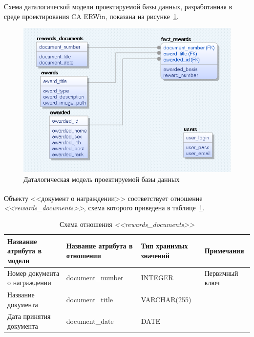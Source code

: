 Схема даталогической модели проектируемой базы данных, разработанная в среде проектирования CA ERWin, 
показана на рисунке~\ref{fig:er_physical}.

\begin{figure}[h]
  \centering
  \includegraphics[width=150mm]{pic/er_physical.png}
  \caption{Даталогическая модель проектируемой базы данных}
  \label{fig:er_physical}
\end{figure}

\paragraph{}
Объекту <<документ о награждении>> соответствует отношение \textit{<<rewards\_documents>>},
схема которого приведена в таблице~\ref{tbl:rewards_documents_scheme}.

\begin{table}[h!]
  \caption{Схема отношения \textit{<<rewards\_documents>>}}
  \label{tbl:rewards_documents_scheme}
  \small{
    \centering
    \begin{tabular}{| p{} | p{} | p{} | p{} |}
      \hline
      Название атрибута \newline в модели &
      Название атрибута \newline в отношении &
      Тип хранимых \newline значений &
      Примечания \\ \hline

      Номер документа \newline о награждении &
      document\_number &
      INTEGER & Первичный ключ \\
      \hline

      Название документа &
      document\_title &
      VARCHAR(255) & \\
      \hline

      Дата принятия документа &
      document\_date &
      DATE & \\
      \hline

    \end{tabular}
  }
\end{table}

